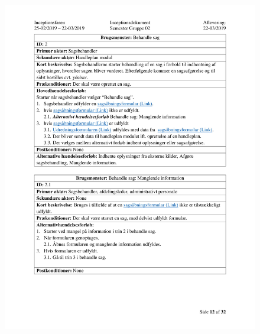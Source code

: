 \begin{figure}[hb]
  \includegraphics[scale = 0.33]{./PNG/Inceptions/Gruppe 02 + InceptionsDokument-13.jpg} 
\end{figure}

